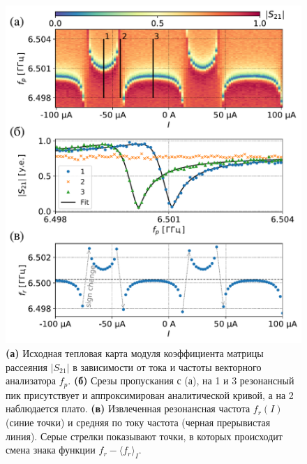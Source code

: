 \documentclass[14pt, a4paper]{extreport}
\numberwithin{equation}{section}
\begin{document}
\begin{figure}
	\centering
	\includegraphics[width=0.7\linewidth]{Pictures/anti_subplots}
	\caption{\textbf{(а)} Исходная тепловая карта модуля коэффициента матрицы рассеяния $|S_{21}|$ в зависимости от тока и частоты векторного анализатора $f_p$. \textbf{(б)} Срезы пропускания с (а), на 1 и 3 резонансный пик присутствует и аппроксимирован аналитической кривой, а на 2 наблюдается плато. \textbf{(в)} Извлеченная резонансная частота $f_r(I)$ (синие точки) и средняя по току частота (черная прерывистая линия). Серые стрелки показывают точки, в которых происходит смена знака функции $f_r - \langle f_r\rangle_I$.}
	\label{fig:antisubplots}
\end{figure}
\end{document}
